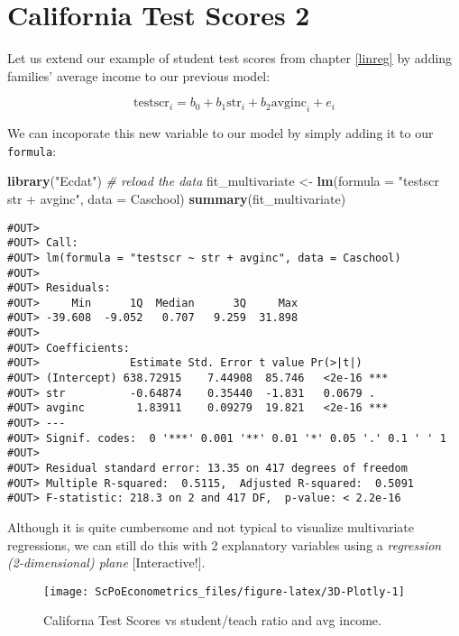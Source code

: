 \documentclass[]{book}
\newenvironment{Shaded}{\begin{snugshade}}{\end{snugshade}}
\newcommand{\KeywordTok}[1]{\textcolor[rgb]{0.13,0.29,0.53}{\textbf{#1}}}
\newcommand{\DataTypeTok}[1]{\textcolor[rgb]{0.13,0.29,0.53}{#1}}
\newcommand{\StringTok}[1]{\textcolor[rgb]{0.31,0.60,0.02}{#1}}
\newcommand{\CommentTok}[1]{\textcolor[rgb]{0.56,0.35,0.01}{\textit{#1}}}
\newcommand{\NormalTok}[1]{#1}
\begin{document}
\section{California Test Scores 2}\label{california-test-scores-2}

Let us extend our example of student test scores from chapter
\ref{linreg} by adding families' average income to our previous model:

\[
\text{testscr}_i = b_0 + b_1  \text{str}_i + b_2  \text{avginc}_i + e_i
\]

We can incoporate this new variable to our model by simply adding it to
our \texttt{formula}:

\begin{Shaded}
\begin{Highlighting}[]
\KeywordTok{library}\NormalTok{(}\StringTok{"Ecdat"}\NormalTok{) }\CommentTok{# reload the data}
\NormalTok{fit_multivariate <-}\StringTok{ }\KeywordTok{lm}\NormalTok{(}\DataTypeTok{formula =} \StringTok{"testscr ~ str + avginc"}\NormalTok{, }\DataTypeTok{data =}\NormalTok{ Caschool)}
\KeywordTok{summary}\NormalTok{(fit_multivariate)}
\end{Highlighting}
\end{Shaded}

\begin{verbatim}
#OUT> 
#OUT> Call:
#OUT> lm(formula = "testscr ~ str + avginc", data = Caschool)
#OUT> 
#OUT> Residuals:
#OUT>     Min      1Q  Median      3Q     Max 
#OUT> -39.608  -9.052   0.707   9.259  31.898 
#OUT> 
#OUT> Coefficients:
#OUT>              Estimate Std. Error t value Pr(>|t|)    
#OUT> (Intercept) 638.72915    7.44908  85.746   <2e-16 ***
#OUT> str          -0.64874    0.35440  -1.831   0.0679 .  
#OUT> avginc        1.83911    0.09279  19.821   <2e-16 ***
#OUT> ---
#OUT> Signif. codes:  0 '***' 0.001 '**' 0.01 '*' 0.05 '.' 0.1 ' ' 1
#OUT> 
#OUT> Residual standard error: 13.35 on 417 degrees of freedom
#OUT> Multiple R-squared:  0.5115,  Adjusted R-squared:  0.5091 
#OUT> F-statistic: 218.3 on 2 and 417 DF,  p-value: < 2.2e-16
\end{verbatim}

Although it is quite cumbersome and not typical to visualize
multivariate regressions, we can still do this with 2 explanatory
variables using a \emph{regression (2-dimensional) plane}
{[}Interactive!{]}.

\begin{figure}

{\centering \texttt{[image: ScPoEconometrics\_files/figure-latex/3D-Plotly-1]} 

}

\caption{Californa Test Scores vs student/teach ratio and avg income.}\label{fig:3D-Plotly}
\end{figure}
\end{document}

